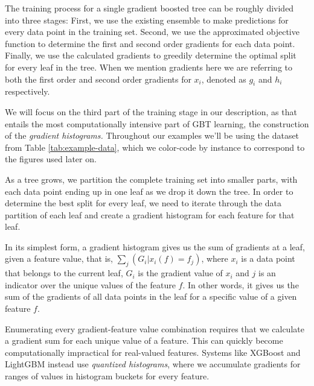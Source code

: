 The training process for a single gradient boosted tree can be roughly divided into three stages:
First, we use the existing ensemble to make predictions for every data point in the training
set. Second, we use the approximated objective function to determine the first and second order
gradients for each data point. Finally, we use the calculated gradients to greedily determine
the optimal split for every leaf in the tree. When we mention gradients here we are referring
to both the first order and second order gradients for $x_i$, denoted as $g_i$ and $h_i$
respectively.

We will focus on the third part of the training stage in our description, as that entails the most
computationally intensive part of GBT learning, the construction of the \emph{gradient histograms.}
Throughout our examples we'll be using the dataset from Table \ref{tab:example-data},
which we color-code by instance to correspond to the figures used later on.

As a tree grows, we partition the complete training set into smaller parts, with each data
point ending up in one leaf as we drop it down the tree.
In order to determine the best split for every leaf, we need to iterate through the data
partition of each leaf and create a gradient histogram for each feature for that leaf.

In its simplest form, a gradient histogram gives us the sum of gradients at a leaf,
given a feature value, that is, $\sum_{j}(G_i | x_i(f) = f_j)$, where $x_i$ is a data point
that belongs to the current leaf,  $G_i$ is the gradient value of $x_i$ and $j$ is an
indicator over the unique values of the feature $f$. In other words, it gives us the
sum of the gradients of all data points in the leaf for a specific value of a given
feature $f$.

Enumerating every gradient-feature value combination requires that we calculate
a gradient sum for each unique value
of a feature. This can quickly become computationally impractical for real-valued features.
Systems like XGBoost and LightGBM instead use \emph{quantized histograms},
where we accumulate gradients for ranges of values in histogram buckets for every feature.

